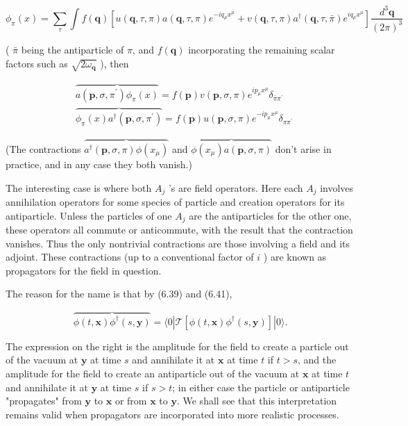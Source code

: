 \documentclass[10pt, letterpaper]{article}
\begin{document}
$$
\phi_{\pi}(x)=\sum_{\tau} \int f(\mathbf{q})\left[u(\mathbf{q}, \tau, \pi) a(\mathbf{q}, \tau, \pi) e^{-i q_{\mu} x^{\mu}}+v(\mathbf{q}, \tau, \pi) a^{\dagger}(\mathbf{q}, \tau, \bar{\pi}) e^{i q_{\mu} x^{\mu}}\right] \frac{d^{3} \mathbf{q}}{(2 \pi)^{3}}
$$

( $\bar{\pi}$ being the antiparticle of $\pi$, and $f(\mathbf{q})$ incorporating the remaining scalar factors such as $\sqrt{2 \omega_{\mathbf{q}}}$ ), then

$$
\begin{aligned}
& \overbrace{a\left(\mathbf{p}, \sigma, \pi^{\prime}\right) \phi_{\pi}(x)}=f(\mathbf{p}) v(\mathbf{p}, \sigma, \pi) e^{i p_{\mu} x^{\mu}} \delta_{\bar{\pi} \pi^{\prime}} \\
& \overbrace{\phi_{\pi}(x) a^{\dagger}\left(\mathbf{p}, \sigma, \pi^{\prime}\right)}=f(\mathbf{p}) u(\mathbf{p}, \sigma, \pi) e^{-i p_{\mu} x^{\mu}} \delta_{\pi \pi^{\prime}}
\end{aligned}
$$

(The contractions $\overbrace{a^{\dagger}(\mathbf{p}, \sigma, \pi) \phi\left(x_{\mu}\right)}$ and $\overbrace{\phi\left(x_{\mu}\right) a(\mathbf{p}, \sigma, \pi)}$ don't arise in practice, and in any case they both vanish.)

The interesting case is where both $A_{j}$ 's are field operators. Here each $A_{j}$ involves annihilation operators for some species of particle and creation operators for its antiparticle. Unless the particles of one $A_{j}$ are the antiparticles for the other one, these operators all commute or anticommute, with the result that the contraction vanishes. Thus the only nontrivial contractions are those involving a field and its adjoint. These contractions (up to a conventional factor of $i$ ) are known as propagators for the field in question.

The reason for the name is that by (6.39) and (6.41),

$$
\overbrace{\phi(t, \mathbf{x}) \phi^{\dagger}(s, \mathbf{y})}=\langle 0| \mathcal{T}\left[\phi(t, \mathbf{x}) \phi^{\dagger}(s, \mathbf{y})\right]|0\rangle .
$$

The expression on the right is the amplitude for the field to create a particle out of the vacuum at $\mathbf{y}$ at time $s$ and annihilate it at $\mathbf{x}$ at time $t$ if $t>s$, and the amplitude for the field to create an antiparticle out of the vacuum at $\mathbf{x}$ at time $t$ and annihilate it at $\mathbf{y}$ at time $s$ if $s>t$; in either case the particle or antiparticle "propagates" from $\mathbf{y}$ to $\mathbf{x}$ or from $\mathbf{x}$ to $\mathbf{y}$. We shall see that this interpretation remains valid when propagators are incorporated into more realistic processes.
\end{document}
